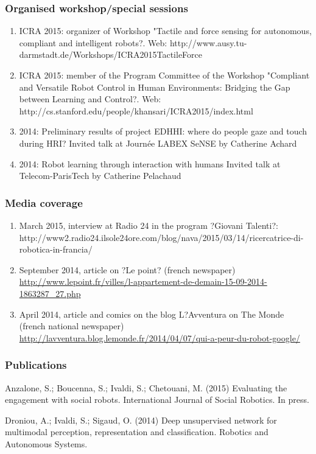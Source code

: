 \subsubsection{Organised workshop/special sessions}
\begin{enumerate}
\item  ICRA 2015: organizer of Workshop "Tactile and force sensing for autonomous, compliant and intelligent robots?. Web: http://www.ausy.tu-darmstadt.de/Workshops/ICRA2015TactileForce 
\item  ICRA 2015: member of the Program Committee of the Workshop "Compliant and Versatile Robot Control in Human Environments: Bridging the Gap between Learning and Control?. Web: http://cs.stanford.edu/people/khansari/ICRA2015/index.html 
\item  2014: Preliminary results of project EDHHI: where do people gaze and touch during HRI?
Invited talk at Journée LABEX SeNSE by Catherine Achard
\item  2014: Robot learning through interaction with humans
Invited talk at Telecom-ParisTech by Catherine Pelachaud
\end{enumerate}


\subsubsection{Media coverage}
\begin{enumerate}
\item  March 2015, interview at Radio 24 in the program ?Giovani Talenti?:
http://www2.radio24.ilsole24ore.com/blog/nava/2015/03/14/ricercatrice-di-robotica-in-francia/
\item  September 2014, article on ?Le point? (french newspaper)
\url{http://www.lepoint.fr/villes/l-appartement-de-demain-15-09-2014-1863287_27.php}
\item  April 2014, article and comics on the blog L?Avventura on The Monde (french national newspaper) \url{http://lavventura.blog.lemonde.fr/2014/04/07/qui-a-peur-du-robot-google/}
\end{enumerate}

\subsubsection{Publications}
Anzalone, S.; Boucenna, S.; Ivaldi, S.; Chetouani, M. (2015) Evaluating the engagement with social robots. International Journal of Social Robotics. In press.

Droniou, A.; Ivaldi, S.; Sigaud, O.  (2014) Deep unsupervised network for multimodal perception, representation and classification. Robotics and Autonomous Systems.


